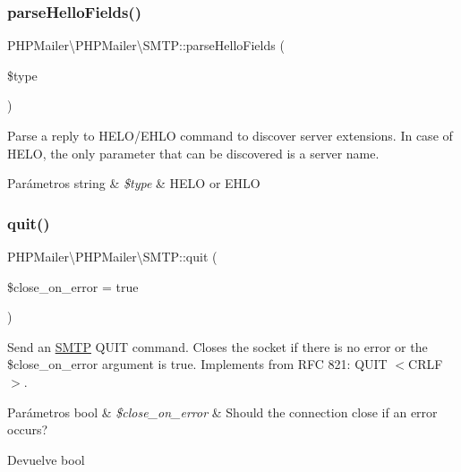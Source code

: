 \subsubsection{\texorpdfstring{parse\+Hello\+Fields()}{parseHelloFields()}}
{\footnotesize\ttfamily P\+H\+P\+Mailer\textbackslash{}\+P\+H\+P\+Mailer\textbackslash{}\+S\+M\+T\+P\+::parse\+Hello\+Fields (\begin{DoxyParamCaption}\item[{}]{\$type }\end{DoxyParamCaption})\hspace{0.3cm}{\ttfamily [protected]}}

Parse a reply to H\+E\+L\+O/\+E\+H\+LO command to discover server extensions. In case of H\+E\+LO, the only parameter that can be discovered is a server name.


\begin{DoxyParams}[1]{Parámetros}
string & {\em \$type} & {\ttfamily H\+E\+LO} or {\ttfamily E\+H\+LO} \\
\hline
\end{DoxyParams}
\mbox{\label{classPHPMailer_1_1PHPMailer_1_1SMTP_a24fcba4fe3670779926dc7d890afb3e6}} 
\subsubsection{\texorpdfstring{quit()}{quit()}}
{\footnotesize\ttfamily P\+H\+P\+Mailer\textbackslash{}\+P\+H\+P\+Mailer\textbackslash{}\+S\+M\+T\+P\+::quit (\begin{DoxyParamCaption}\item[{}]{\$close\+\_\+on\+\_\+error = {\ttfamily true} }\end{DoxyParamCaption})}

Send an \hyperlink{classPHPMailer_1_1PHPMailer_1_1SMTP}{S\+M\+TP} Q\+U\+IT command. Closes the socket if there is no error or the \$close\+\_\+on\+\_\+error argument is true. Implements from R\+FC 821\+: Q\+U\+IT $<$\+C\+R\+L\+F$>$.


\begin{DoxyParams}[1]{Parámetros}
bool & {\em \$close\+\_\+on\+\_\+error} & Should the connection close if an error occurs?\\
\hline
\end{DoxyParams}
\begin{DoxyReturn}{Devuelve}
bool 
\end{DoxyReturn}
\mbox{\label{classPHPMailer_1_1PHPMailer_1_1SMTP_a3fe758d41853a59d4ccfdce815f006a2}} 
